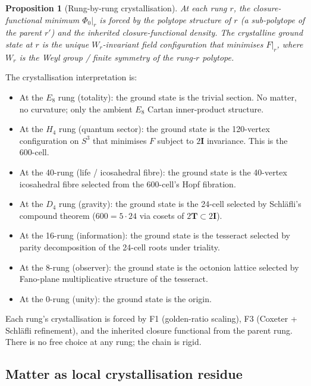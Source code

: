 \documentclass[11pt]{article}
\theoremstyle{plain}
\newtheorem{proposition}[theorem]{Proposition}
\theoremstyle{definition}
\theoremstyle{remark}
\newcommand{\twoI}{2\mathbf{I}}
\newcommand{\twoT}{2\mathbf{T}}
\begin{document}
\begin{proposition}[Rung-by-rung crystallisation]\label{prop:rung-crystal}
At each rung $r$, the closure-functional minimum $\Phi_0\bigr|_r$ is forced by the polytope structure of $r$ (a sub-polytope of the parent $r'$) and the inherited closure-functional density. The crystalline ground state at $r$ is the unique $W_r$-invariant field configuration that minimises $F\bigr|_r$, where $W_r$ is the Weyl group / finite symmetry of the rung-$r$ polytope.
\end{proposition}

The crystallisation interpretation is:
\begin{itemize}[leftmargin=2em]
\item At the $E_8$ rung (totality): the ground state is the trivial section. No matter, no curvature; only the ambient $E_8$ Cartan inner-product structure.
\item At the $H_4$ rung (quantum sector): the ground state is the 120-vertex configuration on $S^3$ that minimises $F$ subject to $\twoI$ invariance. This is the 600-cell.
\item At the 40-rung (life / icosahedral fibre): the ground state is the 40-vertex icosahedral fibre selected from the 600-cell's Hopf fibration.
\item At the $D_4$ rung (gravity): the ground state is the 24-cell selected by Schl\"afli's compound theorem ($600 = 5 \cdot 24$ via cosets of $\twoT \subset \twoI$).
\item At the 16-rung (information): the ground state is the tesseract selected by parity decomposition of the 24-cell roots under triality.
\item At the 8-rung (observer): the ground state is the octonion lattice selected by Fano-plane multiplicative structure of the tesseract.
\item At the 0-rung (unity): the ground state is the origin.
\end{itemize}

Each rung's crystallisation is forced by F1 (golden-ratio scaling), F3 (Coxeter + Schl\"afli refinement), and the inherited closure functional from the parent rung. There is no free choice at any rung; the chain is rigid.

\subsection{Matter as local crystallisation residue}\label{sec:cry-matter}
\end{document}

